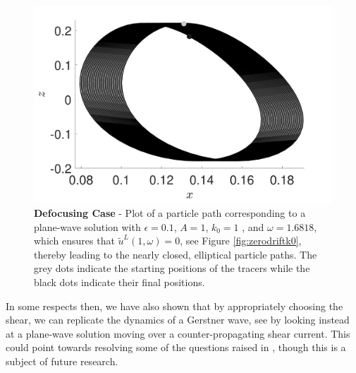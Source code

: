 \documentclass{JFM_Style/jfm}
\begin{document}
\begin{figure}
\centering
\includegraphics[width=.48\textwidth]{om_val_1pt7_k0_1_ep_pt1_defoc_ztrack_pwave}
\caption{\small {\bf Defocusing Case} - Plot of a particle path corresponding to a plane-wave solution with $\epsilon=0.1$, $A=1$, $k_{0}=1$ , and $\omega=1.6818$, which ensures that $\tilde{u}^{L}(1,\omega)=0$, see Figure \ref{fig:zerodriftk0}, thereby leading to the nearly closed, elliptical particle paths.  The grey dots indicate the starting positions of the tracers while the black dots indicate their final positions.  }
\label{fig:pwavezdrift}
\end{figure}

In some respects then, we have also shown that by appropriately choosing the shear, we can replicate the dynamics of a Gerstner wave, see \cite{constantin} by looking instead at a plane-wave solution moving over a counter-propagating shear current.  This could point towards resolving some of the questions raised in \cite{monismith,smith}, though this is a subject of future research.
\end{document}
